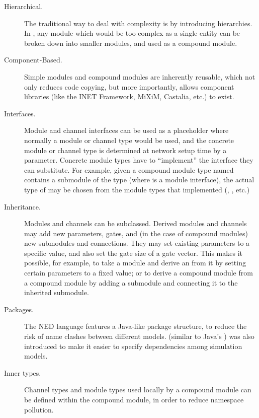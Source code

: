 \begin{description}

\item[Hierarchical.] The traditional way to deal with complexity is by
introducing hierarchies. In {\opp}, any module which would be too complex as
a single entity can be broken down into smaller modules, and used as a
compound module.

\item[Component-Based.] Simple modules and compound modules are inherently
reusable, which not only reduces code copying, but more importantly, allows
component libraries (like the INET Framework, MiXiM, Castalia, etc.) to
exist.

\item[Interfaces.] Module and channel interfaces can be used as a
placeholder where normally a module or channel type would be used, and the
concrete module or channel type is determined at network setup time by a
parameter. Concrete module types have to ``implement'' the interface they
can substitute. For example, given a compound module type named
 contains a  submodule of the type
 (where  is a module interface), the actual
type of  may be chosen from the module types that implemented
 (, , etc.)

\item[Inheritance.] Modules and channels can be subclassed. Derived modules
and channels may add new parameters, gates, and (in the case of compound
modules) new submodules and connections. They may set existing parameters
to a specific value, and also set the gate size of a gate vector. This
makes it possible, for example, to take a  module
and derive an  from it by setting certain parameters to a fixed
value; or to derive a  compound module from a
 compound module by adding a  submodule and
connecting it to the inherited  submodule.

\item[Packages.] The NED language features a Java-like package structure,
to reduce the risk of name clashes between different models. 
(similar to Java's ) was also introduced to make it easier
to specify dependencies among simulation models.

\item[Inner types.] Channel types and module types used locally by a
compound module can be defined within the compound module, in order to
reduce namespace pollution.


\end{description}

